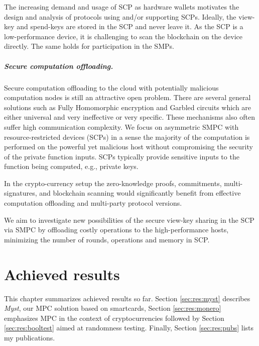 \documentclass[
  digital, %
  twoside, %
  table,   %
  lof,     %
  lot,     %
]{fithesis3}
\newcounter{ph4_show_guides}
\theoremstyle{definition}
\theoremstyle{remark}
\begin{document}
\begin{ecmmnt}
The increasing demand and usage of SCP as hardware wallets motivates the design and analysis of protocols using and/or supporting SCPs. Ideally, the view-key and spend-keys are stored in the SCP and never leave it. As the SCP is a low-performance device, it is challenging to scan the blockchain on the device directly. The same holds for participation in the SMPs.

\paragraph{Secure computation offloading.}
Secure computation offloading to the cloud with potentially malicious computation nodes is still an attractive open problem. There are several general solutions such as Fully Homomorphic encryption and Garbled circuits which are either universal and very ineffective or very specific. These mechanisms also often suffer high communication complexity. 
We focus on asymmetric SMPC with resource-restricted devices (SCPs) in a sense the majority of the computation is performed on the powerful yet malicious host without compromising the security of the private function inputs. SCPs typically provide sensitive inputs to the function being computed, e.g., private keys. 

In the crypto-currency setup the zero-knowledge proofs, commitments, multi-signatures, and blockchain scanning would significantly benefit from effective computation offloading and multi-party protocol versions.

We aim to investigate new possibilities of the secure view-key sharing in the SCP via SMPC by offloading costly operations to the high-performance hosts, minimizing the number of rounds, operations and memory in SCP.
\end{ecmmnt}


\chapter{Achieved results}\label{chapter:results}
This chapter summarizes achieved results so far. Section \ref{sec:res:myst} describes \emph{Myst}, our MPC solution based on smartcards, Section \ref{sec:res:monero} emphasizes MPC in the context of cryptocurrencies followed by Section \ref{sec:res:booltest} aimed at randomness testing. Finally, Section \ref{sec:res:pubs} lists my publications.
\end{document}

